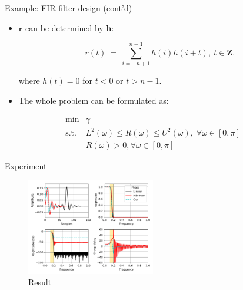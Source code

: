 \documentclass[10pt,ignorenonframetext,serif,onlymath]{beamer}
\begin{document}
\begin{frame}{Example: FIR filter design (cont’d)}
\protect\hypertarget{example-fir-filter-design-contd-2}{}

\begin{itemize}
\item
  \(\mathbf{r}\) can be determined by \(\mathbf{h}\):

  \[r(t)~=~\sum_{i=-n+1}^{n-1}{h(i)h(i+t)},~t\in\mathbf{Z}.\]

  where \(h(t)=0\) for \(t < 0\) or \(t > n - 1\).
\item
  The whole problem can be formulated as:
\end{itemize}

\[\begin{array}{ll}
  \text{min}  & \gamma \\
  \text{s.t.} & L^2(\omega) \leq R(\omega) \leq U^2(\omega), \; \forall \omega \in [0,\pi]   \\
              & R(\omega) > 0, \forall \omega \in [0,\pi]
\end{array}\]

\end{frame}

\begin{frame}{Experiment}
\protect\hypertarget{experiment}{}

\begin{figure}
\centering
\includegraphics[width=0.5\textwidth,height=\textheight]{ellipsoid.files/lowpass.pdf}
\caption{Result}
\end{figure}

\end{frame}
\end{document}
